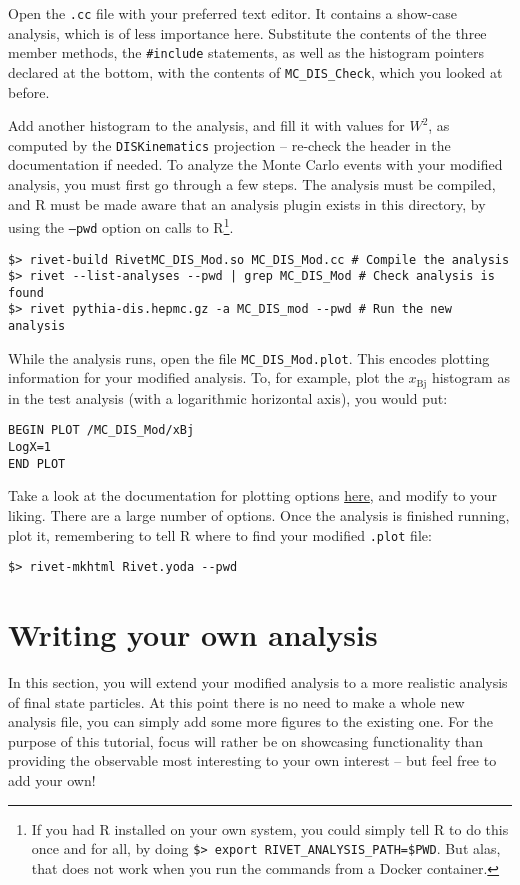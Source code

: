 \documentclass[11pt]{article}
\newcommand{\rivet}{R\protect\scalebox{0.8}{IVET}\xspace}
\begin{document}
Open the \texttt{.cc} file with your preferred text editor. It contains a show-case analysis, which is of less importance here. Substitute the contents of the three member methods, the \texttt{\#include} statements, as well as the histogram pointers declared at the bottom, with the contents of \texttt{MC\_DIS\_Check}, which you looked at before.

Add another histogram to the analysis, and fill it with values for $W^2$, as computed by the \texttt{DISKinematics} projection -- re-check the header in the documentation if needed. To analyze the Monte Carlo events with your modified analysis, you must first go through a few steps. The analysis must be compiled, and \rivet must be made aware that an analysis plugin exists in this directory, by using the \texttt{--pwd} option on calls to \rivet\footnote{If you had \rivet installed on your own system, you could simply tell \rivet to do this once and for all, by doing \texttt{\$> export RIVET\_ANALYSIS\_PATH=\$PWD}. But alas, that does not work when you run the commands from a Docker container.}.
\begin{verbatim}
$> rivet-build RivetMC_DIS_Mod.so MC_DIS_Mod.cc # Compile the analysis
$> rivet --list-analyses --pwd | grep MC_DIS_Mod # Check analysis is found
$> rivet pythia-dis.hepmc.gz -a MC_DIS_mod --pwd # Run the new analysis
\end{verbatim}

While the analysis runs, open the file \texttt{MC\_DIS\_Mod.plot}. This encodes plotting information for your modified analysis. To, for example, plot the $x_{\mathrm{Bj}}$ histogram as in the test analysis (with a logarithmic horizontal axis), you would put:
\begin{verbatim}
BEGIN PLOT /MC_DIS_Mod/xBj
LogX=1
END PLOT
\end{verbatim}
Take a look at the documentation for plotting options \href{https://gitlab.com/hepcedar/rivet/blob/master/doc/tutorials/makeplots.md}{here}, and modify to your liking. There are a large number of options. Once the analysis is finished running, plot it, remembering to tell \rivet where to find your modified \texttt{.plot} file:
\begin{verbatim}
$> rivet-mkhtml Rivet.yoda --pwd
\end{verbatim}

\section{Writing your own analysis}
\label{sec:own-analysis}
In this section, you will extend your modified analysis to a more realistic analysis of final state particles. At this point there is no need to make a whole new analysis file, you can simply add some more figures to the existing one. For the purpose of this tutorial, focus will rather be on showcasing functionality than providing the observable most interesting to your own interest -- but feel free to add your own!
\end{document}
